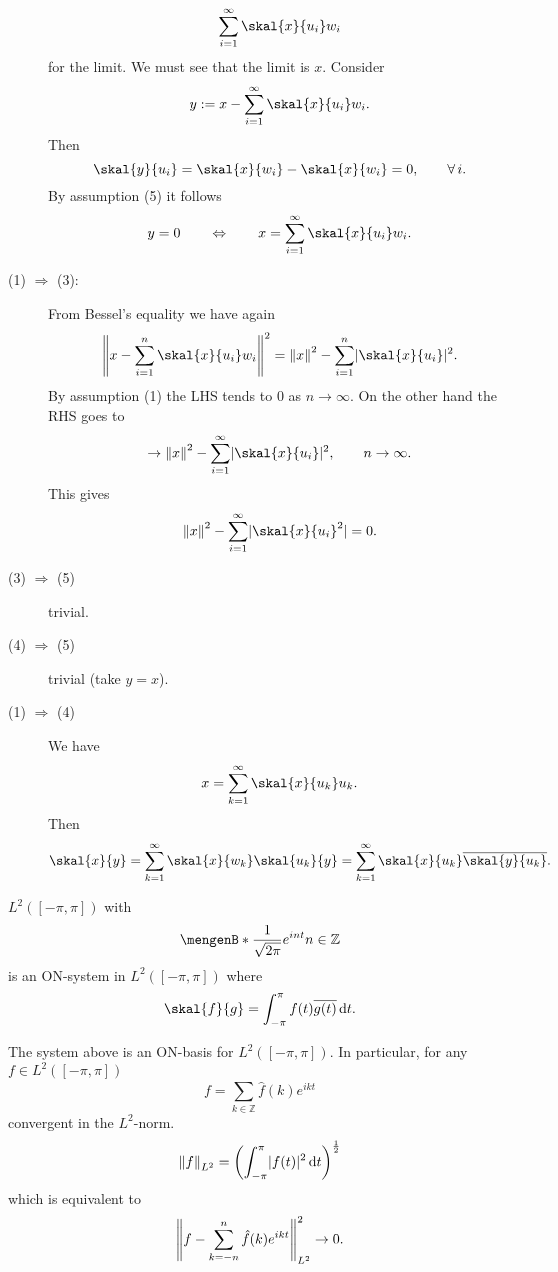 \begin{beweis}
\begin{description}
		\[
			\sum_{i=1}^{\infty} \skal{x}{u_i}w_i 
		\]
		for the limit. We must see that the limit is $x$. Consider
		\[
			y := x - \sum_{i=1}^{\infty} \skal{x}{u_i}w_i.
		\]
		Then 
		\[
			\skal{y}{u_i} = \skal{x}{w_i} - \skal{x}{w_i} = 0, \qquad \forall\, i.
		\]
		By assumption (5) it follows 
		\[
			y = 0 \qquad \Leftrightarrow \qquad x = \sum^{\infty}_{i=1} \skal{x}{u_i}w_i.
		\]
		\item[(1) $\Rightarrow$ (3):] From Bessel's equality we have again
		\[
			\norm{x- \sum^{n}_{i=1}\skal{x}{u_i}w_i}^2 = \norm{x}^2 - \sum^{n}_{i=1}\abs{\skal{x}{u_i}}^2.
		\] 
		By assumption (1) the LHS tends to $0$ as $n \to \infty$. On the other hand the RHS goes to 
		\[
			\to \norm{x}^2 - \sum^{\infty}_{i=1} \abs{\skal{x}{u_i}}^2, \qquad n \to \infty.
		\]
		This gives 
		\[
			\norm{x}^2 - \sum_{i=1}^{\infty} \abs{\skal{x}{u_i}^2} = 0.
		\]
		\item[(3) $\Rightarrow $ (5)] trivial.
		\item[(4) $\Rightarrow $ (5)] trivial (take $y=x$).
		\item[(1) $\Rightarrow $ (4)] We have
		\[
			x = \sum_{k=1}^{\infty} \skal{x}{u_k}u_k.
		\]
		Then
		\[
			\skal{x}{y} = \sum_{k=1}^{\infty} \skal{x}{w_k}\skal{u_k}{y} = \sum_{k=1}^{\infty}\skal{x}{u_k}\overline{\skal{y}{u_k}}.
		\]
 	\end{description}
\end{beweis}

\begin{beispiel}
	$L^2([- \pi, \pi])$ with
	\[
		\set[\frac{1}{\sqrt{2\pi}}e ^{int}]{n \in \mathbb{Z}}
	\]
	is an ON-system in $L^2([-\pi, \pi])$ where
	\[
		\skal{f}{g} = \int_{-\pi}^{\pi} f(t) \overline{g(t)} \,\mathrm{d}t.
	\]
\end{beispiel}

\begin{satz}
	The system above is an ON-basis for $L^2([-\pi,\pi])$. In particular, for any $f \in L^2([-\pi,\pi])$
	\[
		f = \sum_{k \in \mathbb{Z}}^{} \hat f(k) e^{ikt}
	\]
	convergent in the $L^2$-norm.
	\[
		\norm{f}_{L^2} = \left( \int_{-\pi}^{\pi} \abs{f(t)}^2 \,\mathrm{d}t \right)^{\frac{1}{2}}
	\]
	which is equivalent to
	\[
		\norm{f - \sum_{k=-n}^{n} \hat f(k) e^{ikt}}^2_{L^2} \to 0.
	\]
\end{satz}


